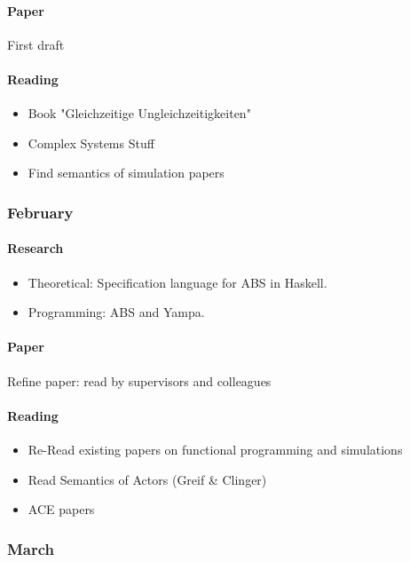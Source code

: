 \paragraph{Paper} First draft
	
\paragraph{Reading}
	\begin{itemize}
		\item Book "Gleichzeitige Ungleichzeitigkeiten"
		\item Complex Systems Stuff
		\item Find semantics of simulation papers
	\end{itemize}
	
\subsubsection{February}
\paragraph{Research}
	\begin{itemize}
		\item Theoretical: Specification language for ABS in Haskell.
		\item Programming: ABS and Yampa.
	\end{itemize}
		
\paragraph{Paper} Refine paper: read by supervisors and colleagues
	
\paragraph{Reading}
	\begin{itemize}
		\item Re-Read existing papers on functional programming and simulations 
		\item Read Semantics of Actors (Greif \& Clinger)
		\item ACE papers
	\end{itemize}
	
\subsubsection{March}
